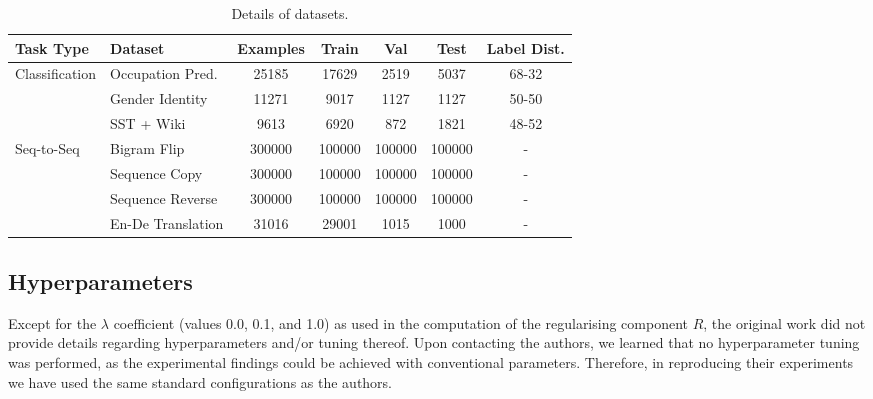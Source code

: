 \begin{table}
  \caption{Details of datasets.}
  \label{tab:dataset-table}
  \centering
  	\setlength\tabcolsep{5pt}
\begin{tabular}{llccccc}
\toprule
 Task Type               &    Dataset                   & Examples & Train & Val  & Test & Label Dist.\\ \midrule
Classification & Occupation Pred. &     25185       & 17629         & 2519      & 5037       & 68-32 \\
               & Gender Identity       &    11271       & 9017          & 1127      & 1127       & 50-50   \\
               & SST + Wiki            &    9613        & 6920          & 872       & 1821       & 48-52   \\ \midrule
Seq-to-Seq     & Bigram Flip           &    300000      &   100000      &  100000   & 100000  &   -       \\
               & Sequence Copy         &    300000      &   100000      &   100000  & 100000  &   -     \\
               & Sequence Reverse      &    300000      &   100000      &  100000   & 100000  &    -    \\
               & En-De Translation     &    31016       &    29001      &  1015     & 1000    &    -    \\
               \bottomrule
  \end{tabular}
\end{table}

\subsection{Hyperparameters}

Except for the $\lambda$ coefficient (values 0.0, 0.1, and 1.0) as used in the computation of the regularising component $R$, the original work did not provide details regarding hyperparameters and/or tuning thereof. Upon contacting the authors, we learned that no hyperparameter tuning was performed, as the experimental findings could be achieved with conventional parameters. Therefore, in reproducing their experiments we have used the same standard configurations as the authors. %


